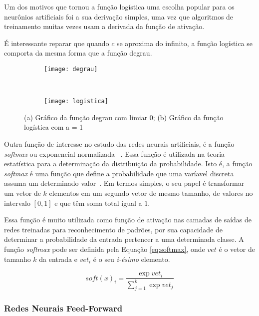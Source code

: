 Um dos motivos que tornou a função logística uma escolha popular para os neurônios artificiais foi a sua derivação simples, uma vez que algoritmos de treinamento muitas vezes usam a derivada da função de ativação.

É interessante reparar que quando $c$ se aproxima do infinito, a função logística se comporta da mesma forma que a função degrau.

\begin{figure}
 \centering
\begin{subfigure}{.9\textwidth}
  \centering
  \texttt{[image: degrau]}
	\caption{}
	\label{fig:ativacao:sub:degrau}
	\centering
\end{subfigure}\
\begin{subfigure}{.9\textwidth}
  \centering
  \texttt{[image: logistica]}
	\caption{}
	\label{fig:ativacao:sub:logistica}
	\centering
\end{subfigure}
\caption{(a) Gráfico da função degrau com limiar 0; (b) Gráfico da função logística com a = 1}
\label{fig:ativacao}
\centering
\end{figure}

Outra função de interesse no estudo das redes neurais artificiais, é a função \textit{softmax} ou exponencial normalizada ~\cite{bishop2006pattern}. Essa função é utilizada na teoria estatística para a determinação da distribuição da probabilidade. Isto é, a função \textit{softmax} é uma função que define a probabilidade que uma varíavel discreta assuma um determinado valor~\cite{altmanbs}. Em termos simples, o seu papel é transformar um vetor de $k$ elementos em um segundo vetor de mesmo tamanho, de valores no intervalo $[0,1]$ e que têm soma total igual a $1$.

Essa função é muito utilizada como função de ativação nas camadas de saídas de redes treinadas para reconhecimento de padrões, por sua capacidade de determinar a probabilidade da entrada pertencer a uma determinada classe. A função \textit{softmax} pode ser definida pela Equação \ref{eq:softmax}, onde $vet$ é o vetor de tamanho $k$ da entrada e $vet_i$ é o seu \textit{i-ésimo} elemento.

\begin{equation}
soft(x)_i = \frac{\exp{vet_i}}{\sum_{j=1}^k\exp{vet_j}}
\label{eq:softmax}
\end{equation}




\subsubsection{Redes Neurais Feed-Forward}

